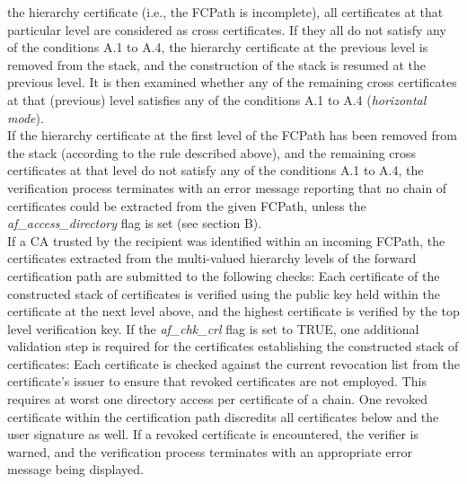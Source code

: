 the hierarchy certificate (i.e., the FCPath is incomplete), all certificates at 
that particular level are considered as cross certificates. If they all do not 
satisfy any of the conditions A.1 to A.4, the hierarchy certificate at the previous level 
is removed from the stack, and the construction of the stack is resumed at
the previous level.
It is then examined whether any of the remaining cross certificates at that 
(previous) level satisfies any of the conditions A.1 to A.4 ({\em horizontal mode}).
\\ [1em]
If the hierarchy certificate at the first level of the FCPath has been 
removed from the stack (according to the rule described above), and 
the remaining cross certificates at that level do not satisfy any of the conditions A.1 to A.4, 
the verification process terminates with an error message reporting that 
no chain of certificates could be extracted from the given FCPath, unless
the {\em af\_access\_directory} flag is set (see section B).
\\ [1em]
If a CA trusted by the recipient was identified within an incoming FCPath, the certificates
extracted from the multi-valued hierarchy levels of the forward certification path are
submitted to the following checks:
\bi
\m Each certificate of the constructed stack of certificates is verified using the public 
key held within the
certificate at the next level above, and the highest certificate is  
verified by the top level verification key.
\m If the {\em af\_chk\_crl} flag is set to TRUE, one additional validation step
is required for the certificates establishing the constructed stack of certificates: 
Each certificate is checked against the current revocation list from the 
certificate's issuer to ensure that revoked certificates are not employed. 
This requires at worst one directory access per certificate of a chain. One 
revoked certificate within the certification path discredits all certificates 
below and the user signature as well. If a revoked certificate is encountered,
the verifier is warned, and the verification process terminates with an 
appropriate error message being displayed. \\ [1em]
\ei


